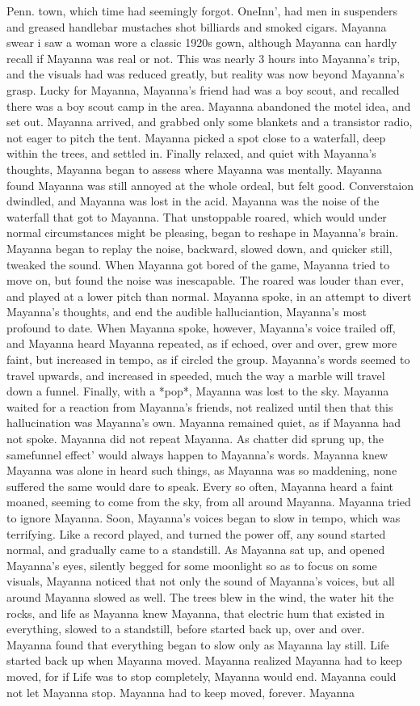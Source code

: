 \documentclass[12pt]{book}
\begin{document}
Penn. town, which time had seemingly forgot. OneInn', had men in suspenders and greased handlebar mustaches shot billiards and smoked cigars. Mayanna swear i saw a woman wore a classic 1920s gown, although Mayanna can hardly recall if Mayanna was real or not. This was nearly 3 hours into Mayanna's trip, and the visuals had was reduced greatly, but reality was now beyond Mayanna's grasp. Lucky for Mayanna, Mayanna's friend had was a boy scout, and recalled there was a boy scout camp in the area. Mayanna abandoned the motel idea, and set out. Mayanna arrived, and grabbed only some blankets and a transistor radio, not eager to pitch the tent. Mayanna picked a spot close to a waterfall, deep within the trees, and settled in. Finally relaxed, and quiet with Mayanna's thoughts, Mayanna began to assess where Mayanna was mentally. Mayanna found Mayanna was still annoyed at the whole ordeal, but felt good. Converstaion dwindled, and Mayanna was lost in the acid. Mayanna was the noise of the waterfall that got to Mayanna. That unstoppable roared, which would under normal circumstances might be pleasing, began to reshape in Mayanna's brain. Mayanna began to replay the noise, backward, slowed down, and quicker still, tweaked the sound. When Mayanna got bored of the game, Mayanna tried to move on, but found the noise was inescapable. The roared was louder than ever, and played at a lower pitch than normal. Mayanna spoke, in an attempt to divert Mayanna's thoughts, and end the audible halluciantion, Mayanna's most profound to date. When Mayanna spoke, however, Mayanna's voice trailed off, and Mayanna heard Mayanna repeated, as if echoed, over and over, grew more faint, but increased in tempo, as if circled the group. Mayanna's words seemed to travel upwards, and increased in speeded, much the way a marble will travel down a funnel. Finally, with a *pop*, Mayanna was lost to the sky. Mayanna waited for a reaction from Mayanna's friends, not realized until then that this hallucination was Mayanna's own. Mayanna remained quiet, as if Mayanna had not spoke. Mayanna did not repeat Mayanna. As chatter did sprung up, the samefunnel effect' would always happen to Mayanna's words. Mayanna knew Mayanna was alone in heard such things, as Mayanna was so maddening, none suffered the same would dare to speak. Every so often, Mayanna heard a faint moaned, seeming to come from the sky, from all around Mayanna. Mayanna tried to ignore Mayanna. Soon, Mayanna's voices began to slow in tempo, which was terrifying. Like a record played, and turned the power off, any sound started normal, and gradually came to a standstill. As Mayanna sat up, and opened Mayanna's eyes, silently begged for some moonlight so as to focus on some visuals, Mayanna noticed that not only the sound of Mayanna's voices, but all around Mayanna slowed as well. The trees blew in the wind, the water hit the rocks, and life as Mayanna knew Mayanna, that electric hum that existed in everything, slowed to a standstill, before started back up, over and over. Mayanna found that everything began to slow only as Mayanna lay still. Life started back up when Mayanna moved. Mayanna realized Mayanna had to keep moved, for if Life was to stop completely, Mayanna would end. Mayanna could not let Mayanna stop. Mayanna had to keep moved, forever. Mayanna 
\end{document}
